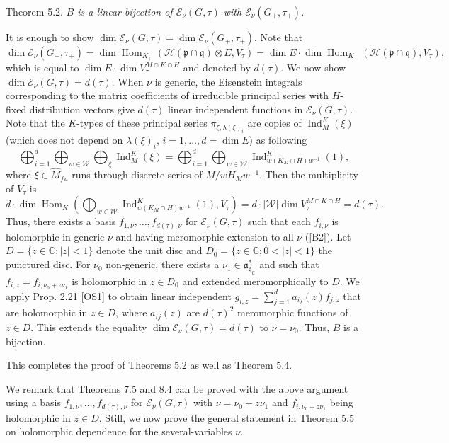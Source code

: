 \documentclass[a4paper]{amsart}
\theoremstyle{plain}
\theoremstyle{definition}
\def\Hom{\operatorname{Hom}}
\def\Ind{\operatorname{Ind}}
\newcommand{\fra}{\mathfrak{a}}
\newcommand{\frp}{\mathfrak{p}}
\newcommand{\frq}{\mathfrak{q}}
\newcommand{\bbC}{\mathbb{C}}
\newcommand{\caE}{\mathcal{E}}
\newcommand{\caH}{\mathcal{H}}
\newcommand{\caW}{\mathcal{W}}
\begin{document}
\smallskip
Theorem 5.2. {\it $B$ is a linear bijection of  $\caE_\nu(G,\tau)$ with $\caE_\nu(G_+,\tau_+)$.}



 It is enough to show $\dim \caE_\nu(G,\tau)= \dim \caE_\nu(G_+,\tau_+)$.
Note that
$$\dim \caE_\nu(G_+,\tau_+) =\dim \Hom_{K_+}(\caH(\frp\cap\frq)\otimes E, V_\tau)=
\dim E \cdot \dim \Hom_{K_+}(\caH(\frp\cap\frq), V_\tau),$$
which is equal to $\dim E \cdot \dim V_\tau^{M\cap K\cap H}$ and denoted by $d(\tau)$.
 We now show $\dim \caE_\nu(G,\tau)= d(\tau)$.  When $\nu$ is
generic,  the Eisenstein integrals corresponding to the matrix coefficients of irreducible principal series with $H$-fixed distribution vectors give $d(\tau)$ linear independent functions in $\caE_\nu(G,\tau)$.
Note that the $K$-types
of these principal series $\pi_{\xi,\lambda(\xi)_i}$ are copies of  $\Ind^K_M(\xi)$ (which does not depend on $\lambda(\xi)_i$,
$i=1,\dots,d=\dim E$) as following
$$\bigoplus_{i=1}^{d}\bigoplus_{w\in \caW}\bigoplus_{\xi}\Ind^K_M(\xi)=\bigoplus_{i=1}^d \bigoplus_{w\in \caW}\Ind^K_{w(K_M\cap H)w^{-1}}(1), $$
where  $\xi\in \widehat{M}_{fu}$ runs through discrete series of $M/wH_Mw^{-1}$.
Then the multiplicity of $V_\tau$ is
$$d\cdot \dim \Hom_K(\bigoplus_{w\in \caW}\Ind^K_{w(K_M\cap H)w^{-1}}(1),V_\tau)=d\cdot|\caW| \dim V_\tau^{M\cap K\cap H}=d(\tau).$$
Thus,  there exists
a basis $f_{1,\nu},\ldots,f_{d(\tau),\nu}$ for $\caE_\nu(G,\tau)$ such that each $f_{i,\nu}$ is holomorphic in generic $\nu$ and having
meromorphic extension to all $\nu$ ([B2]).  Let $D=\{z \in \bbC; |z|<1\}$ denote the unit disc
 and $D_0=\{z \in \bbC; 0<|z|<1\}$  the punctured disc. For $\nu_0$ non-generic, there exists a $\nu_1\in \fra^*_{\frq_\bbC}$ and such that $f_{i,z}=f_{i,\nu_0+z\nu_1}$ is holomorphic in $z\in D_0$ and  extended meromorphically to $D$. We apply Prop. 2.21 [OS1] to obtain linear independent $g_{i,z}=\sum_{j=1}^da_{ij}(z)f_{j,z}$ that are holomorphic in $z\in D$,
where $a_{ij}(z)$ are $d(\tau)^2$ meromorphic functions of $z\in D$. This extends the equality
$\dim \caE_\nu(G,\tau)= d(\tau)$ to $\nu=\nu_0$.  Thus, $B$ is a bijection.

This completes the proof of Theorems 5.2 as well as Theorem 5.4.


We remark that Theorems 7.5 and 8.4 can be proved with the above argument using a basis $f_{1,\nu},\ldots,f_{d(\tau),\nu}$ for  $\caE_\nu(G,\tau)$ with $\nu=\nu_0+z\nu_1$ and $f_{i,\nu_0+z\nu_1}$ being holomorphic in $z\in D$.  Still, we now prove the general statement in Theorem 5.5 on holomorphic dependence for the several-variables $\nu$.
\end{document}
